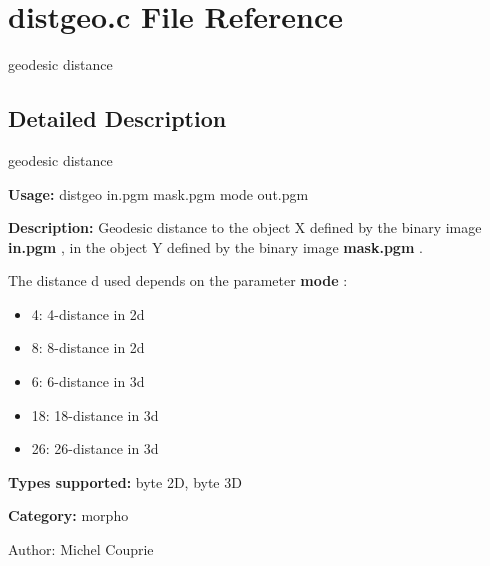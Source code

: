 \section{distgeo.c File Reference}
\label{distgeo_8c}
geodesic distance 



\subsection{Detailed Description}
geodesic distance 

{\bf Usage:} distgeo in.pgm mask.pgm mode out.pgm

{\bf Description:} Geodesic distance to the object X defined by the binary image {\bf in.pgm} , in the object Y defined by the binary image {\bf mask.pgm} .

The distance d used depends on the parameter {\bf mode} : \begin{itemize}
\item 4: 4-distance in 2d \item 8: 8-distance in 2d \item 6: 6-distance in 3d \item 18: 18-distance in 3d \item 26: 26-distance in 3d\end{itemize}
{\bf Types supported:} byte 2D, byte 3D

{\bf Category:} morpho

\begin{Desc}
\item[Author:]Michel Couprie \end{Desc}
